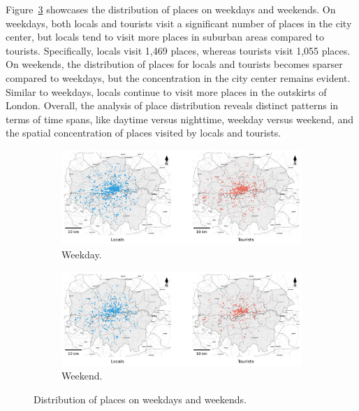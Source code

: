 \documentclass{article}
\theoremstyle{definition}
\theoremstyle{remark}
\begin{document}
Figure~\ref{fig:places_distribution_week} showcases the distribution of places on weekdays and weekends. On weekdays, both locals and tourists visit a significant number of places in the city center, but locals tend to visit more places in suburban areas compared to tourists. Specifically, locals visit 1,469 places, whereas tourists visit 1,055 places. On weekends, the distribution of places for locals and tourists becomes sparser compared to weekdays, but the concentration in the city center remains evident. Similar to weekdays, locals continue to visit more places in the outskirts of London. Overall, the analysis of place distribution reveals distinct patterns in terms of time spans, like daytime versus nighttime, weekday versus weekend, and the spatial concentration of places visited by locals and tourists.


\begin{figure}[!h]

\centering
\begin{subfigure}{0.6\textheight}
\centering
\includegraphics[width=0.9\linewidth]{figures/places_weekday.png}
\caption{Weekday.}
\label{fig:places_weekday}
\end{subfigure}
\begin{subfigure}{0.6\textheight}
\centering
\includegraphics[width=0.9\linewidth]{figures/places_weekend.png}
\caption{Weekend.}
\label{fig:places_weekend}
\end{subfigure}

\caption{Distribution of places on weekdays and weekends.}
\label{fig:places_distribution_week}
\end{figure}
\end{document}
